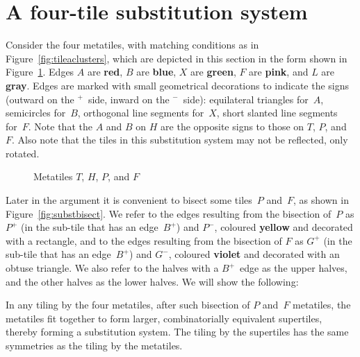 \section{A four-tile substitution system}
\label{sec:subst}

Consider the four metatiles, with matching conditions as in
Figure~\ref{fig:tileaclusters}, which are depicted in this section in
the form shown in Figure~\ref{fig:subst}.  Edges $A$ are
\textcolor{\colA}{\textbf{red}}, $B$ are
\textcolor{\colB}{\textbf{blue}}, $X$ are
\textcolor{\colX}{\textbf{green}}, $F$ are
\textcolor{\colF}{\textbf{pink}}, and $L$ are
\textcolor{\colL}{\textbf{gray}}.  Edges are marked with small
geometrical decorations to indicate the signs (outward on the
${}^+$~side, inward on the ${}^-$~side): equilateral triangles
for~$A$, semicircles for~$B$, orthogonal line segments for~$X$, short
slanted line segments for~$F$.  Note that the $A$ and $B$ on $H$ are
the opposite signs to those on $T$, $P$, and $F$.  Also note that the
tiles in this substitution system may not be reflected, only rotated.

\begin{figure}[htp!]
\begin{center}
\end{center}
\caption{Metatiles $T$, $H$, $P$, and $F$}
\label{fig:subst}
\end{figure}

Later in the argument it is convenient to bisect some tiles~$P$
and~$F$, as shown in Figure~\ref{fig:substbisect}.  We refer to the
edges resulting from the bisection of~$P$ as $P^+$ (in the sub-tile
that has an edge~$B^+$) and $P^-$, coloured
\textcolor{\colP}{\textbf{yellow}} and decorated with a rectangle, and
to the edges resulting from the bisection of $F$ as $G^+$ (in the
sub-tile that has an edge~$B^+$) and $G^-$, coloured
\textcolor{\colG}{\textbf{violet}} and decorated with an obtuse
triangle.  We also refer to the halves with a $B^+$~edge as the upper
halves, and the other halves as the lower halves.  We will show the
following:

\begin{theorem}
\label{thm:subst}
In any tiling by the four metatiles, after such bisection of $P$
and~$F$ metatiles, the metatiles fit together to form larger,
combinatorially equivalent supertiles, thereby forming a substitution
system.  The tiling by the supertiles has the same symmetries as the
tiling by the metatiles.
\end{theorem}

